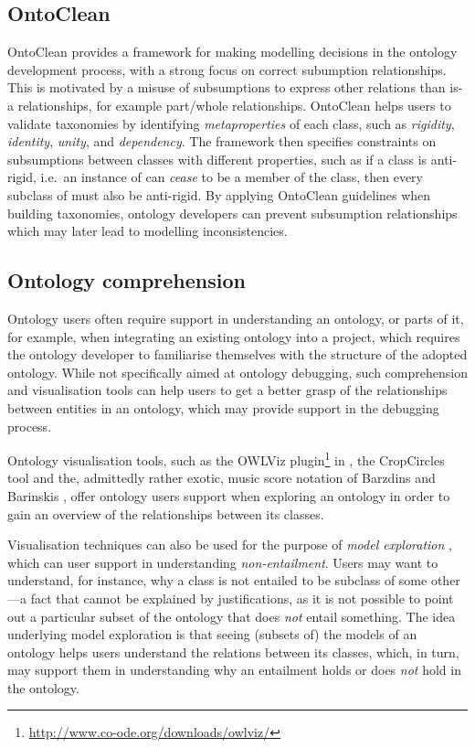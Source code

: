 \subsection{OntoClean}

OntoClean \cite{guarino02aa,guarino04aa} provides a framework for making modelling decisions in the ontology development process, with a strong focus on correct subumption relationships. This is motivated by a misuse of subsumptions to express other relations than is-a relationships, for example part/whole relationships. OntoClean helps users to validate taxonomies by identifying \emph{metaproperties} of each class, such as \emph{rigidity}, \emph{identity}, \emph{unity}, and \emph{dependency}. The framework then specifies constraints on subsumptions between classes with different properties, such as if a class  is anti-rigid, i.e.\ an instance of  can \emph{cease} to be a member of the class, then every subclass of  must also be anti-rigid. By applying OntoClean guidelines when building taxonomies, ontology developers can prevent subsumption relationships which may later lead to modelling inconsistencies.

\subsection{Ontology comprehension}

Ontology users often require support in understanding an ontology, or parts of it, for example, when integrating an existing ontology into a project, which requires the ontology developer to familiarise themselves with the structure of the adopted ontology. While not specifically aimed at ontology debugging, such comprehension and visualisation tools can  help users to get a better grasp of the relationships between entities in an ontology, which may provide support in the debugging process.

Ontology visualisation tools, such as the OWLViz plugin\footnote{\url{http://www.co-ode.org/downloads/owlviz/}} in \protege, the CropCircles tool \cite{wang06wr} and the, admittedly rather exotic, music score notation of Barzdins and Barinskis \cite{barinskis07uz}, offer ontology users support when exploring an ontology in order to gain an overview of the relationships between its classes.

Visualisation techniques can also be used for the purpose of \emph{model exploration} \cite{bauer09ru}, which can user support in understanding \emph{non-entailment}. Users may want to understand, for instance, why a class is not entailed to be subclass of some other---a fact that cannot be explained by justifications, as it is not possible to point out a particular subset of the ontology that does \emph{not} entail something. The idea underlying model exploration is that seeing (subsets of) the models of an ontology helps users understand the relations between its classes, which, in turn, may support them in understanding why an entailment holds or does \emph{not} hold in the ontology.


